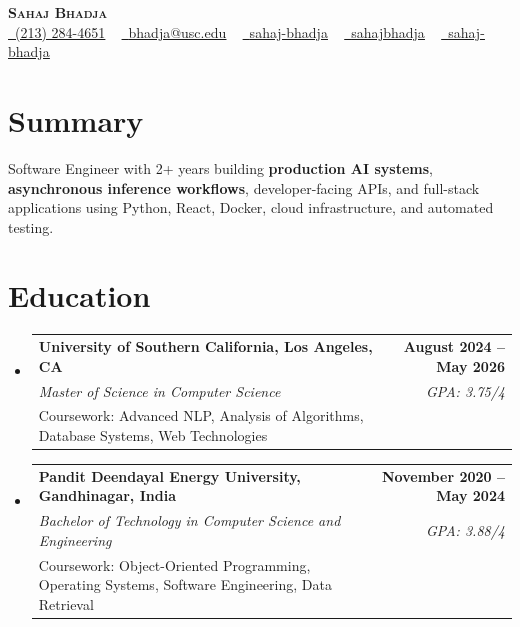 \documentclass[letterpaper,10pt]{article}
\makeatletter
\newcommand{\sectionGap}{\vspace{-8pt}}
\newcommand{\resumeEduSubheading}[5]{\vspace{-1pt}\item\begin{tabular*}{1.0\textwidth}[t]{l@{\extracolsep{\fill}}r}\textbf{#1} & \textbf{\small #2} \\\textit{\small #3} & \textit{\small #4} \\\small #5 & \\\end{tabular*}\vspace{-4pt}}
\newcommand{\resumeSubHeadingListStart}{\begin{itemize}[leftmargin=0.0in, label={}]}
\newcommand{\resumeSubHeadingListEnd}{\end{itemize}}
\makeatother
\begin{document}
\begin{center}
{\Huge \scshape \textbf{Sahaj Bhadja}} \\ \vspace{1pt}
\small \href{tel:2132844651}{\faPhone\ \underline{(213) 284-4651}} ~ \href{mailto:bhadja@usc.edu}{\raisebox{-0.2\height}\faEnvelope\ \underline{bhadja@usc.edu}} ~
\href{https://www.linkedin.com/in/sahaj-bhadja/}{\raisebox{-0.2\height}\faLinkedin\ \underline{sahaj-bhadja}} ~ \href{https://github.com/SAHAJ-BHADJA}{\raisebox{-0.2\height}\faGithub\ \underline{sahajbhadja}} ~
\href{https://sahaj-bhadja.vercel.app/}{\raisebox{-0.2\height}\faGlobe\ \underline{sahaj-bhadja}}
\end{center}
\vspace{-16pt}
\section{Summary}
\begin{itemize}[leftmargin=0.15in, label={}]
\small{\item{Software Engineer with 2+ years building \textbf{production AI systems}, \textbf{asynchronous inference workflows}, developer-facing APIs, and full-stack applications using Python, React, Docker, cloud infrastructure, and automated testing.}}
\end{itemize}
\sectionGap
\section{Education}
\resumeSubHeadingListStart
\resumeEduSubheading{University of Southern California, Los Angeles, CA}{August 2024 -- May 2026}{Master of Science in Computer Science}{GPA: 3.75/4}{Coursework: Advanced NLP, Analysis of Algorithms, Database Systems, Web Technologies}
\resumeEduSubheading{Pandit Deendayal Energy University, Gandhinagar, India}{November 2020 -- May 2024}{Bachelor of Technology in Computer Science and Engineering}{GPA: 3.88/4}{Coursework: Object-Oriented Programming, Operating Systems, Software Engineering, Data Retrieval}
\resumeSubHeadingListEnd
\sectionGap
\end{document}
